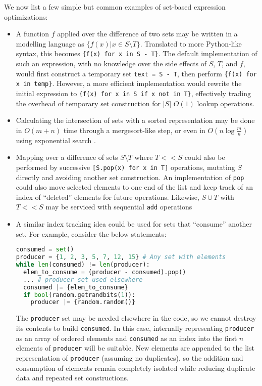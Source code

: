 \documentclass{article}
\begin{document}
We now list a few simple but common examples of set-based expression optimizations:
\begin{itemize}
  \item A function $f$ applied over the difference of two sets may be written in a modelling language as $\{f(x) | x \in S \setminus T\}$. Translated to more Python-like syntax, this becomes \texttt{\{f(x) for x in S - T\}}. The default implementation of such an expression, with no knowledge over the side effects of $S$, $T$, and $f$, would first construct a temporary set \texttt{text = S - T}, then perform \texttt{\{f(x) for x in temp\}}. However, a more efficient implementation would rewrite the initial expression to \texttt{\{f(x) for x in S if x not in T\}}, effectively trading the overhead of temporary set construction for $|S|$ $O(1)$ lookup operations.
  \item Calculating the intersection of sets with a sorted representation may be done in $O(m+n)$ time through a mergesort-like step, or even in $O(n\log{\frac{m}{n}})$ using exponential search \cite{sortedIntersectionStackOverflow}.
  \item Mapping over a difference of sets $S \setminus T$ where $T << S$ could also be performed by successive \texttt{[S.pop(x) for x in T]} operations, mutating $S$ directly and avoiding another set construction. An implementation of \texttt{pop} could also move selected elements to one end of the list and keep track of an index of ``deleted'' elements for future operations. Likewise, $S \cup T$ with $T << S$ may be serviced with sequential \texttt{add} operations
  \item A similar index tracking idea could be used for sets that ``consume'' another set. For example, consider the below statements:
  \begin{lstlisting}[language=python]
consumed = set()
producer = {1, 2, 3, 5, 7, 12, 15} # Any set with elements
while len(consumed) != len(producer):
  elem_to_consume = (producer - consumed).pop()
  ... # producer set used elsewhere
  consumed |= {elem_to_consume}
  if bool(random.getrandbits(1)):
    producer |= {random.random()}
\end{lstlisting}
  The \texttt{producer} set may be needed elsewhere in the code, so we cannot destroy its contents to build \texttt{consumed}. In this case, internally representing \texttt{producer} as an array of ordered elements and \texttt{consumed} as an index into the first $n$ elements of \texttt{producer} will be suitable. New elements are appended to the list representation of \texttt{producer} (assuming no duplicates), so the addition and consumption of elements remain completely isolated while reducing duplicate data and repeated set constructions.
\end{itemize}
\end{document}
